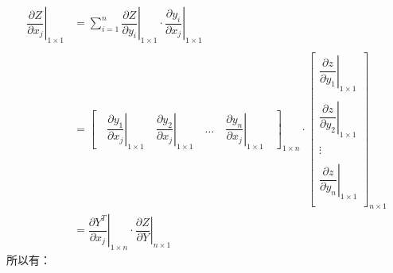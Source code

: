 \documentclass[withoutpreface,bwprint]{cumcmthesis} %
\begin{document}
	\begin{align*}
		\left. \dfrac{\partial Z}{\partial x_j} \right|_{1{\times}1}
		&=
		\sum_{i=1}^{n} \left. \dfrac{\partial Z}{\partial y_i} \right|_{1{\times}1} 
		\cdot
		\left. \dfrac{\partial y_i}{\partial x_j} \right|_{1{\times}1} 
		\\\\
		&=
		\left[
		\quad
			\left. \dfrac{\partial y_1}{\partial x_j} \right|_{1{\times}1}  \quad
			\left. \dfrac{\partial y_2}{\partial x_j} \right|_{1{\times}1} \quad
			\ldots \quad
			\left. \dfrac{\partial y_n}{\partial x_j} \right|_{1{\times}1}  
			\quad
		\right]_{1{\times}n}
		\cdot
		\left[
			\begin{array}{c}
				\left. \dfrac{\partial z}{\partial y_1} \right|_{1{\times}1} \\\\
				\left. \dfrac{\partial z}{\partial y_2} \right|_{1{\times}1} \\\\
				\vdots \\\\
				\left. \dfrac{\partial z}{\partial y_n} \right|_{1{\times}1}\\
			\end{array}
		\right]_{n{\times}1}\\
		&=
		\left. \dfrac{\partial Y^T}{\partial x_j} \right|_{1{\times}n} 
		\cdot
		\left. \dfrac{\partial Z}{\partial Y} \right|_{n{\times}1}  
	\end{align*}
	所以有：\\
\end{document}
